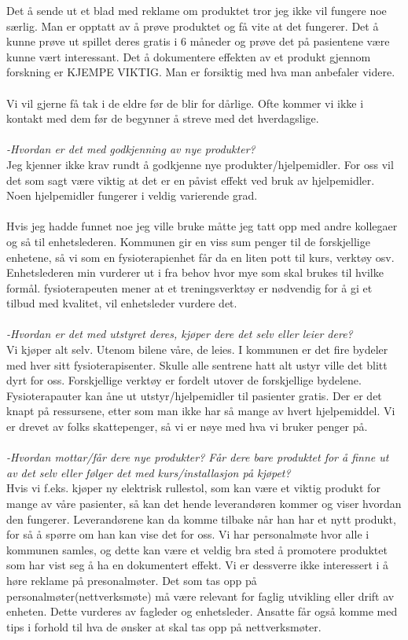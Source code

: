 Det å sende ut et blad med reklame om produktet tror jeg ikke vil fungere noe særlig. Man er opptatt av å prøve produktet og få vite at det fungerer. Det å kunne prøve ut spillet deres gratis i 6 måneder og prøve det på pasientene være kunne vært interessant. Det å dokumentere effekten av et produkt gjennom forskning er KJEMPE VIKTIG. Man er forsiktig med hva man anbefaler videre. \\ \\
Vi vil gjerne få tak i de eldre før de blir for dårlige. Ofte kommer vi ikke i kontakt med dem før de begynner å streve med det hverdagslige.\\ \\ 
\emph{-Hvordan er det med godkjenning av nye produkter?} \\
Jeg kjenner ikke  krav rundt å godkjenne nye produkter/hjelpemidler. For oss vil det som sagt være viktig at det er en påvist effekt ved bruk av hjelpemidler. Noen hjelpemidler fungerer i veldig varierende grad. \\ \\
Hvis jeg hadde funnet noe jeg ville bruke måtte jeg tatt opp med andre kollegaer og så til enhetslederen. Kommunen gir en viss sum penger til de forskjellige enhetene, så vi som en fysioterapienhet får da en liten pott til kurs, verktøy osv. Enhetslederen min vurderer ut i fra behov hvor mye som skal brukes til hvilke formål. fysioterapeuten mener  at et treningsverktøy er nødvendig for å gi et tilbud med kvalitet, vil enhetsleder vurdere det. \\ \\
\emph{-Hvordan er det med utstyret deres, kjøper dere det selv eller leier dere?} \\
Vi kjøper alt selv. Utenom bilene våre, de leies. I kommunen er det fire bydeler med hver sitt fysioterapisenter. Skulle alle sentrene hatt alt ustyr ville det blitt dyrt for oss. Forskjellige verktøy er fordelt utover de forskjellige bydelene. Fysioterapauter kan åne ut utstyr/hjelpemidler til pasienter gratis. Der er det knapt på ressursene, etter som man ikke har så mange av hvert hjelpemiddel. Vi er drevet av folks skattepenger, så vi er nøye med hva vi bruker penger på.\\ \\ 
\emph{-Hvordan mottar/får dere nye produkter? Får dere bare produktet for å finne ut av det selv eller følger det med kurs/installasjon på kjøpet? }\\
Hvis vi f.eks. kjøper ny elektrisk rullestol, som kan være et viktig produkt for mange av våre pasienter, så kan det hende leverandøren kommer og viser hvordan den fungerer. Leverandørene kan da komme tilbake når han har et nytt produkt, for så å spørre om han kan vise det for oss. Vi har personalmøte hvor alle i kommunen samles, og dette kan være et veldig bra sted å promotere produktet som har vist seg å ha en dokumentert effekt. Vi er dessverre ikke interessert i å høre reklame på presonalmøter. Det som tas opp på personalmøter(nettverksmøte) må være relevant for faglig utvikling eller drift av enheten. Dette vurderes av fagleder og enhetsleder. Ansatte får også komme med tips i forhold til hva de ønsker at skal tas opp på nettverksmøter.
